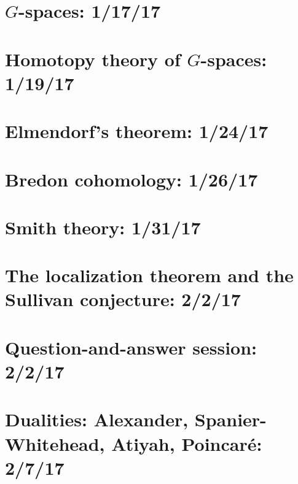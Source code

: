 \documentclass{style_EHT}
\begin{document}
\frontstuff

\section{$G$-spaces: 1/17/17}
	
\section{Homotopy theory of $G$-spaces: 1/19/17}
	
\section{Elmendorf's theorem: 1/24/17}
	
\section{Bredon cohomology: 1/26/17}
	
\section{Smith theory: 1/31/17}
	
\section{The localization theorem and the Sullivan conjecture: 2/2/17}
	
\section{Question-and-answer session: 2/2/17}
	
\section{Dualities: Alexander, Spanier-Whitehead, Atiyah, Poincaré: 2/7/17}
	


{}

\end{document}
